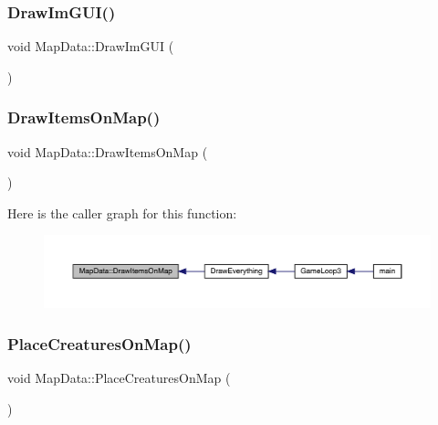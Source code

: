 \subsubsection{\texorpdfstring{Draw\+Im\+G\+U\+I()}{DrawImGUI()}}
{\footnotesize\ttfamily void Map\+Data\+::\+Draw\+Im\+G\+UI (\begin{DoxyParamCaption}{ }\end{DoxyParamCaption})}

\mbox{\label{class_map_data_abfdefc2bef87a02d3d83176ad6ba7832}} 
\subsubsection{\texorpdfstring{Draw\+Items\+On\+Map()}{DrawItemsOnMap()}}
{\footnotesize\ttfamily void Map\+Data\+::\+Draw\+Items\+On\+Map (\begin{DoxyParamCaption}{ }\end{DoxyParamCaption})}

Here is the caller graph for this function\+:
\nopagebreak
\begin{figure}[H]
\begin{center}
\leavevmode
\includegraphics[width=350pt]{de/d83/class_map_data_abfdefc2bef87a02d3d83176ad6ba7832_icgraph}
\end{center}
\end{figure}
\mbox{\label{class_map_data_ad377a46f779bfcb9ac57dcdd3a969eca}} 
\subsubsection{\texorpdfstring{Place\+Creatures\+On\+Map()}{PlaceCreaturesOnMap()}}
{\footnotesize\ttfamily void Map\+Data\+::\+Place\+Creatures\+On\+Map (\begin{DoxyParamCaption}{ }\end{DoxyParamCaption})}

